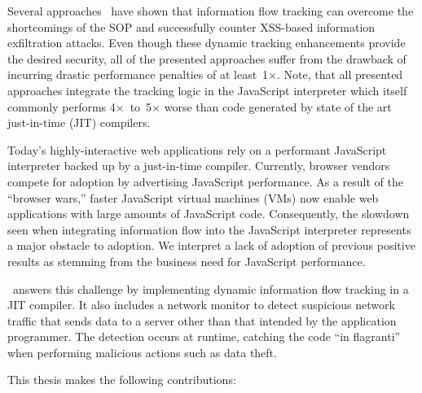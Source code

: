 Several approaches~\cite{vogt.etal+07,just.etal+11,groef.etal+12,kerschbaumer.etal+13} have shown that information flow tracking can overcome the shortcomings of the SOP and successfully counter XSS-based information exfiltration attacks.
Even though these dynamic tracking enhancements provide the desired security, all of the presented approaches suffer from the drawback of incurring drastic performance penalties of at least~1$\times$.
Note, that all presented approaches integrate the tracking logic in the JavaScript interpreter which itself commonly performs 4$\times$~to~5$\times$ worse than code generated by state of the art just-in-time (JIT) compilers.

Today's highly-interactive web applications rely on a performant JavaScript interpreter backed up by a just-in-time compiler.
Currently, browser vendors compete for adoption by advertising JavaScript performance.
As a result of the ``browser wars,'' faster JavaScript virtual machines (VMs) now enable web applications with large amounts of JavaScript code.
Consequently, the slowdown seen when integrating information flow into the JavaScript interpreter represents a major obstacle to adoption.
We interpret a lack of adoption of previous positive results as stemming from the business need for JavaScript performance.

\JitFlow\ answers this challenge by implementing dynamic information flow tracking in a JIT compiler.
It also includes a network monitor to detect suspicious network traffic that sends data to a server other than that intended by the application programmer.
The detection occurs at runtime, catching the code ``in flagranti'' when performing malicious actions such as data theft.

This thesis makes the following contributions:

